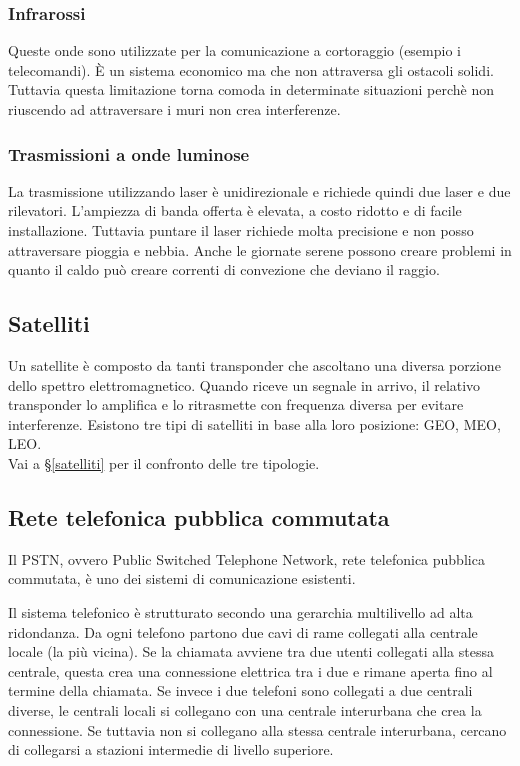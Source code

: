 \subsubsection{Infrarossi}
Queste onde sono utilizzate per la comunicazione a cortoraggio (esempio i telecomandi).
\`E un sistema economico ma che non attraversa gli ostacoli solidi.
Tuttavia questa limitazione torna comoda in determinate situazioni perchè non riuscendo ad attraversare i muri non crea interferenze.

\subsubsection{Trasmissioni a onde luminose}
La trasmissione utilizzando laser è unidirezionale e richiede quindi due laser e due rilevatori.
L'ampiezza di banda offerta è elevata, a costo ridotto e di facile installazione.
Tuttavia puntare il laser richiede molta precisione e non posso attraversare pioggia e nebbia.
Anche le giornate serene possono creare problemi in quanto il caldo può creare correnti di convezione che deviano il raggio.

\subsection{Satelliti}

Un satellite è composto da tanti transponder che ascoltano una diversa porzione dello spettro elettromagnetico.
Quando riceve un segnale in arrivo, il relativo transponder lo amplifica e lo ritrasmette con frequenza diversa per evitare interferenze.
Esistono tre tipi di satelliti in base alla loro posizione: GEO, MEO, LEO.\\
Vai a §\ref{satelliti} per il confronto delle tre tipologie.

\subsection{Rete telefonica pubblica commutata}
Il PSTN, ovvero Public Switched Telephone Network, rete telefonica pubblica commutata, è uno dei sistemi di comunicazione esistenti. 

Il sistema telefonico è strutturato secondo una gerarchia multilivello ad alta ridondanza.
Da ogni telefono partono due cavi di rame collegati alla centrale locale (la più vicina). 
Se la chiamata avviene tra due utenti collegati alla stessa centrale, questa crea una connessione elettrica tra i due e rimane aperta fino al termine della chiamata.
Se invece i due telefoni sono collegati a due centrali diverse, le centrali locali si collegano con una centrale interurbana che crea la connessione. 
Se tuttavia non si collegano alla stessa centrale interurbana, cercano di collegarsi a stazioni intermedie di livello superiore.

